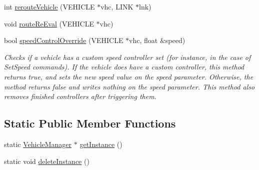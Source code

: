 \begin{DoxyCompactItemize}
int \hyperlink{classtraci__api_1_1_vehicle_manager_a47a471305d82ae97f65ac2c90f384baa}{reroute\+Vehicle} (V\+E\+H\+I\+C\+LE $\ast$vhc, L\+I\+NK $\ast$lnk)
\item 
void \hyperlink{classtraci__api_1_1_vehicle_manager_a02bcdc3429c0b027345148d9f5824554}{route\+Re\+Eval} (V\+E\+H\+I\+C\+LE $\ast$vhc)
\item 
bool \hyperlink{classtraci__api_1_1_vehicle_manager_acebd30eec75b857573c9237d9a15244f}{speed\+Control\+Override} (V\+E\+H\+I\+C\+LE $\ast$vhc, float \&speed)
\begin{DoxyCompactList}\small\item\em Checks if a vehicle has a custom speed controller set (for instance, in the case of Set\+Speed commands). If the vehicle does have a custom controller, this method returns true, and sets the new speed value on the speed parameter. Otherwise, the method returns false and writes nothing on the speed parameter. This method also removes finished controllers after triggering them. \end{DoxyCompactList}\end{DoxyCompactItemize}
\subsection*{Static Public Member Functions}
\begin{DoxyCompactItemize}
\item 
static \hyperlink{classtraci__api_1_1_vehicle_manager}{Vehicle\+Manager} $\ast$ \hyperlink{classtraci__api_1_1_vehicle_manager_a2f2e2b5647eda9af94094da62788cd2e}{get\+Instance} ()
\item 
static void \hyperlink{classtraci__api_1_1_vehicle_manager_ac1ff1be2d47078aae68f6ed9ef5ff187}{delete\+Instance} ()
\end{DoxyCompactItemize}
